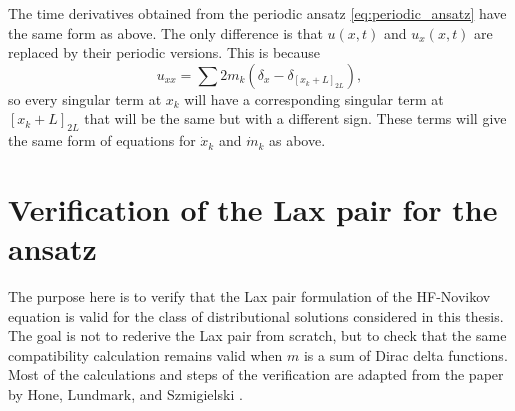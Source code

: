 \documentclass[english,master]{liumaiex}
\theoremstyle{thesisplain}
\theoremstyle{thesisdefinition}
\numberwithin{equation}{section}
\begin{document}
The time derivatives obtained from the periodic ansatz \eqref{eq:periodic_ansatz} have the same form as above. The only difference is that $u(x, t)$ and $u_x(x, t)$ are replaced by their periodic versions. This is because
\begin{equation}
	u_{xx} = \sum 2 m_k (\delta_x - \delta_{[x_k + L]_{2L}}), 
\end{equation}
so every singular term at $x_k$ will have a corresponding singular term at $[x_k + L]_{2L}$ that will be the same but with a different sign. These terms will give the same form of equations for $\dot{x}_k$ and $\dot{m}_k$ as above.

\section{Verification of the Lax pair for the ansatz}
\label{sec:VerificationLax}

The purpose here is to verify that the Lax pair formulation of the HF-Novikov equation is valid for the class of distributional solutions considered in this thesis. The goal is not to rederive the Lax pair from scratch, but to check that the same compatibility calculation remains valid when $m$ is a sum of Dirac delta functions. Most of the calculations and steps of the verification are adapted from the paper by Hone, Lundmark, and Szmigielski \cite{Hone_2009}.
\end{document}
